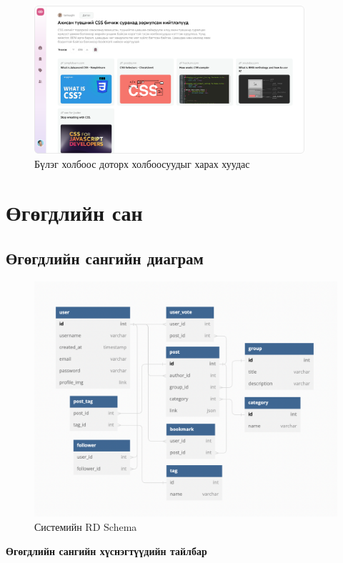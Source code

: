 \begin{figure}[h]
	\centering
	\includegraphics[width=10cm]{images/interfaces/grouped-link.png}
	\caption{Бүлэг холбоос доторх холбоосуудыг харах хуудас}
	\label{fig:grouped}
\end{figure}

\clearpage
\section{Өгөгдлийн сан}

\subsection{Өгөгдлийн сангийн диаграм}
\begin{figure}[h]
	\centering
	\includegraphics[width=15cm]{images/erdiagram.png}
	\caption{Системийн RD Schema}
	\label{fig:erd}
\end{figure}

\textbf{Өгөгдлийн сангийн хүснэгтүүдийн тайлбар}

